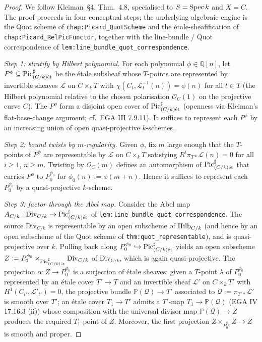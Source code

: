 \begin{proof}
  
  We follow Kleiman~\S 4, Thm.~4.8, specialised to \(S = \operatorname{Spec} k\) and
  \(X = C\). The proof proceeds in four conceptual steps; the underlying
  algebraic engine is the Quot scheme of \texttt{chap:Picard_QuotScheme}
  and the \'etale-sheafification of \texttt{chap:Picard_RelPicFunctor},
  together with the line-bundle / Quot correspondence of
  \texttt{lem:line_bundle_quot_correspondence}.

  \emph{Step 1: stratify by Hilbert polynomial.}
  For each polynomial \(\phi \in \mathbb{Q}[n]\), let \(P^\phi \subseteq
  \operatorname{Pic}^\sharp_{(C/k)\mathrm{\acute{e}t}}\) be the \'etale subsheaf whose \(T\)-points are
  represented by invertible sheaves \(\mathcal{L}\) on \(C \times_k T\) with
  \(\chi(C_t, \mathcal{L}_t^{-1}(n)) = \phi(n)\) for all \(t \in T\) (the
  Hilbert polynomial relative to the chosen polarisation
  \(\mathcal{O}_C(1)\) on the projective curve \(C\)). The \(P^\phi\) form a
  disjoint open cover of \(\operatorname{Pic}^\sharp_{(C/k)\mathrm{\acute{e}t}}\) (openness via Kleiman's
  flat-base-change argument; cf.\ EGA III 7.9.11). It suffices to
  represent each \(P^\phi\) by an increasing union of open quasi-projective
  \(k\)-schemes.

  \emph{Step 2: bound twists by \(m\)-regularity.}
  Given \(\phi\), fix \(m\) large enough that the \(T\)-points of \(P^\phi\) are
  representable by \(\mathcal{L}\) on \(C \times_k T\) satisfying
  \(R^i \pi_{T*} \mathcal{L}(n) = 0\) for all \(i \ge 1\), \(n \ge m\). Twisting
  by \(\mathcal{O}_C(m)\) defines an automorphism of \(\operatorname{Pic}^\sharp_{(C/k)\mathrm{\acute{e}t}}\)
  that carries \(P^\phi\) to \(P^{\phi_0}_0\) for \(\phi_0(n) := \phi(m + n)\).
  Hence it suffices to represent each \(P^{\phi_0}_0\) by a quasi-projective
  \(k\)-scheme.

  \emph{Step 3: factor through the Abel map.}
  Consider the Abel map \(A_{C/k} : \mathrm{Div}_{C/k} \to \operatorname{Pic}^\sharp_{(C/k)\mathrm{\acute{e}t}}\)
  of \texttt{lem:line_bundle_quot_correspondence}. The source \(\mathrm{Div}_{C/k}\)
  is representable by an open subscheme of \(\operatorname{Hilb}_{C/k}\) (and hence by an
  open subscheme of the Quot scheme of \texttt{thm:quot_representable}), and
  is quasi-projective over \(k\). Pulling back along
  \(P^{\phi_0}_0 \hookrightarrow \operatorname{Pic}^\sharp_{(C/k)\mathrm{\acute{e}t}}\) yields an open
  subscheme \(Z := P^{\phi_0}_0 \times_{\operatorname{Pic}^\sharp_{(C/k)\mathrm{\acute{e}t}}} \mathrm{Div}_{C/k}\)
  of \(\mathrm{Div}_{C/k}\), which is again quasi-projective. The projection
  \(\alpha : Z \to P^{\phi_0}_0\) is a surjection of \'etale sheaves:
  given a \(T\)-point \(\lambda\) of \(P^{\phi_0}_0\) represented by an \'etale
  cover \(T' \to T\) and an invertible sheaf \(\mathcal{L}'\) on \(C \times_k
  T'\) with \(H^1(C_{t'}, \mathcal{L}'_{t'}) = 0\), the projective bundle
  \(\mathbb{P}(\mathcal{Q}) \to T'\) associated to
  \(\mathcal{Q} := \pi_{T'*}\mathcal{L}'\) is smooth over \(T'\); an \'etale
  cover \(T_1 \to T'\) admits a \(T'\)-map \(T_1 \to \mathbb{P}(\mathcal{Q})\)
  (EGA IV 17.16.3 (ii)) whose composition with the universal divisor map
  \(\mathbb{P}(\mathcal{Q}) \to Z\) produces the required \(T_1\)-point of \(Z\).
  Moreover, the first projection \(Z \times_{P^{\phi_0}_0} Z \to Z\) is
  smooth and proper.


\end{proof}
